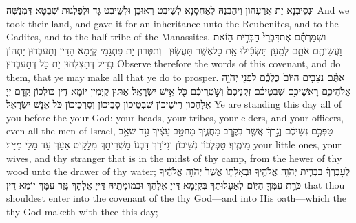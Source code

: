 {וּנְסֵיבְנָא יָת אֲרַעְהוֹן וִיהַבְנַהּ לְאַחְסָנָא לְשֵׁיבֶט רְאוּבֵן וּלְשֵׁיבֶט גָּד וּלְפַלְגוּת שִׁבְטָא דִּמְנַשֶּׁה׃}
{And we took their land, and gave it for an inheritance unto the Reubenites, and to the Gadites, and to the half-tribe of the Manassites.}{}
{וּשְׁמַרְתֶּ֗ם אֶת\maqqaf דִּבְרֵי֙ הַבְּרִ֣ית הַזֹּ֔את וַעֲשִׂיתֶ֖ם אֹתָ֑ם לְמַ֣עַן תַּשְׂכִּ֔ילוּ אֵ֖ת כׇּל\maqqaf אֲשֶׁ֥ר תַּעֲשֽׂוּן׃ \petucha }
{וְתִטְּרוּן יָת פִּתְגָמֵי קְיָמָא הָדֵין וְתַעְבְּדוּן יָתְהוֹן בְּדִיל דְּתַצְלְחוּן יָת כָּל דְּתַעְבְּדוּן׃}
{Observe therefore the words of this covenant, and do them, that ye may make all that ye do to prosper.}{}
{אַתֶּ֨ם נִצָּבִ֤ים הַיּוֹם֙ כֻּלְּכֶ֔ם לִפְנֵ֖י יְהֹוָ֣ה אֱלֹהֵיכֶ֑ם רָאשֵׁיכֶ֣ם שִׁבְטֵיכֶ֗ם זִקְנֵיכֶם֙ וְשֹׁ֣טְרֵיכֶ֔ם כֹּ֖ל אִ֥ישׁ יִשְׂרָאֵֽל׃}
{אַתּוּן קָיְמִין יוֹמָא דֵין כּוּלְּכוֹן קֳדָם יְיָ אֱלָהָכוֹן רֵישֵׁיכוֹן שִׁבְטֵיכוֹן סָבֵיכוֹן וְסָרְכֵיכוֹן כֹּל אֱנָשׁ יִשְׂרָאֵל׃}
{Ye are standing this day all of you before the \lord\space your God: your heads, your tribes, your elders, and your officers, even all the men of Israel,}{}
{טַפְּכֶ֣ם נְשֵׁיכֶ֔ם וְגֵ֣רְךָ֔ אֲשֶׁ֖ר בְּקֶ֣רֶב מַחֲנֶ֑יךָ מֵחֹטֵ֣ב עֵצֶ֔יךָ עַ֖ד שֹׁאֵ֥ב מֵימֶֽיךָ׃}
{טַפְלְכוֹן נְשֵׁיכוֹן וְגִיּוֹרָךְ דִּבְגוֹ מַשְׁרִיתָךְ מִלָּקֵיט אָעָךְ עַד מָלֵי מַיָּיךְ׃}
{your little ones, your wives, and thy stranger that is in the midst of thy camp, from the hewer of thy wood unto the drawer of thy water;}{}
{לְעׇבְרְךָ֗ בִּבְרִ֛ית יְהֹוָ֥ה אֱלֹהֶ֖יךָ וּבְאָלָת֑וֹ אֲשֶׁר֙ יְהֹוָ֣ה אֱלֹהֶ֔יךָ כֹּרֵ֥ת עִמְּךָ֖ הַיּֽוֹם׃}
{לְאַעָלוּתָךְ בִּקְיָמָא דַּייָ אֱלָהָךְ וּבְמוֹמָתֵיהּ דַּייָ אֱלָהָךְ גָּזַר עִמָּךְ יוֹמָא דֵין׃}
{that thou shouldest enter into the covenant of the \lord\space thy God—and into His oath—which the \lord\space thy God maketh with thee this day;}{}
